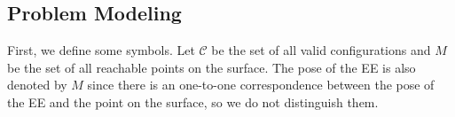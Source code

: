 \documentclass[journal]{IEEEtran}
\begin{document}
%
%
%

\subsection{Problem Modeling}
First, we define some symbols. Let $\mathscr{C}$ be the set of all valid configurations and $M$ be the set of all reachable points on the surface. The pose of the EE is also denoted by $M$ since there is an one-to-one correspondence between the pose of the EE and the point on the surface, so we do not distinguish them. 
\end{document}
